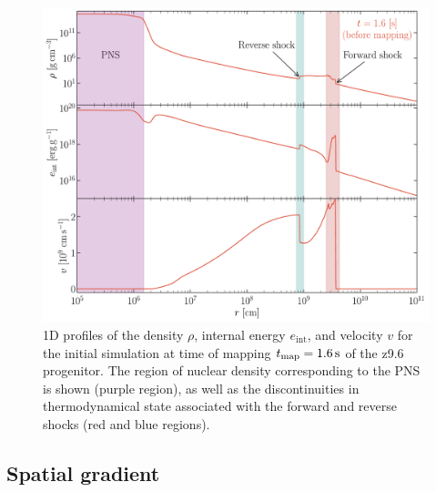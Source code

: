 \begin{figure}[ht!]
    \centering
    \includegraphics[width=1.0\linewidth]{figures/features_1d.pdf}
    \caption{1D profiles of the density \(\rho\), internal energy \(e_\mathrm{int}\), and velocity \(v\) for the initial simulation at time of mapping \(t_\mathrm{map} = 1.6\,\mathrm{s}\) of the z9.6 progenitor. The region of nuclear density corresponding to the PNS is shown (purple region), as well as the discontinuities in thermodynamical state associated with the forward and reverse shocks (red and blue regions).}
    \label{fig:z96_features}
\end{figure}

\clearpage

\subsection{Spatial gradient} \label{sec:results_gradient}


